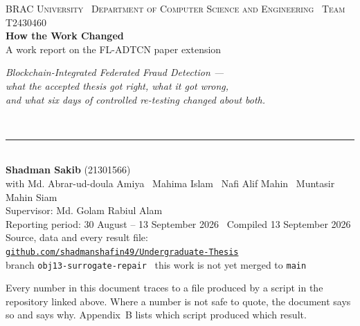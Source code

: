 \documentclass[11pt]{article}
\begin{document}
\thispagestyle{empty}

\begin{center}
  \vspace*{0.4cm}
  {\footnotesize\color{steel}\textsc{BRAC University \textbullet\ Department of Computer Science and Engineering \textbullet\ Team T2430460}}\\[14pt]
  {\Huge\bfseries\color{navy} How the Work Changed}\\[8pt]
  {\LARGE\color{ink} A work report on the FL-ADTCN paper extension}\\[16pt]
  \begin{minipage}{0.86\textwidth}\centering
  {\large\itshape Blockchain-Integrated Federated Fraud Detection ---\\ what the accepted thesis got right, what it got wrong,\\ and what six days of controlled re-testing changed about both.}
  \end{minipage}\\[20pt]
  {\color{rule}\rule{0.6\textwidth}{0.8pt}}\\[14pt]
  {\normalsize \textbf{Shadman Sakib} (21301566)}\\[3pt]
  {\small with Md. Abrar-ud-doula Amiya \textbullet\ Mahima Islam \textbullet\ Nafi Alif Mahin \textbullet\ Muntasir Mahin Siam}\\[3pt]
  {\small Supervisor: Md. Golam Rabiul Alam}\\[16pt]
  {\small\color{steel}Reporting period: 30 August -- 13 September 2026 \textbullet\ Compiled 13 September 2026}\\[12pt]
  {\footnotesize\color{steel}Source, data and every result file:}\\[3pt]
  {\small\texttt{\href{https://github.com/shadmanshafin49/Undergraduate-Thesis}{github.com/shadmanshafin49/Undergraduate-Thesis}}}\\[3pt]
  {\footnotesize\color{steel}branch \texttt{obj13-surrogate-repair} \textbullet\ this work is not yet merged to \texttt{main}}
\end{center}

\vfill
{\footnotesize\color{steel}\noindent Every number in this document traces to a file produced by a
script in the repository linked above. Where a number is not safe to quote, the document says so and says why.
Appendix~B lists which script produced which result.}

\newpage
\thispagestyle{empty}
\end{document}
